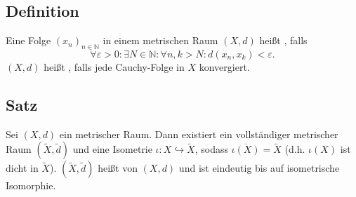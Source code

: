 \subsection[Definition: Cauchy-Folge und Vollständigkeit]{Definition} %
\label{sub:14}
Eine Folge $(x_n)_{n \in \mathds{N}}$ in einem metrischen Raum $(X,d)$ heißt , falls
\[
	\forall \varepsilon>0 : \exists N \in \mathds{N} : \forall n,k >N : d(x_n,x_k) < \varepsilon.
\]
$(X,d)$ heißt , falls jede Cauchy-Folge in $X$ konvergiert. 

\subsection[Satz: Existenz einer eindeutigen Vervollständigung metrischer Räume]{Satz} %
\label{sub:15}
Sei $(X,d)$ ein metrischer Raum. Dann existiert ein vollständiger metrischer Raum $(\tilde{X}, \tilde{d})$ und eine Isometrie $\iota \colon X \hookrightarrow \tilde{X}$, 
sodass $\overline{\iota(X)} = \tilde{X}$ (d.h. $\iota(X)$ ist dicht in $\tilde{X}$). $(\tilde{X}, \tilde{d})$ heißt  von $(X,d)$ und ist eindeutig 
bis auf isometrische Isomorphie.
